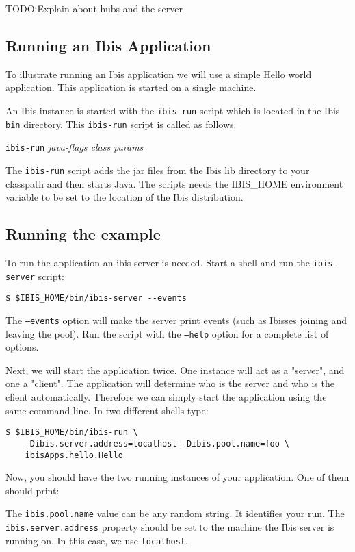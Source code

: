 \documentclass[10pt]{article}
\newcommand{\mysubsection}[1]{\subsection{#1}\label{#1}}
\begin{document}
TODO:Explain about hubs and the server

\mysubsection{Running an Ibis Application}

To illustrate running an Ibis application we will use a simple Hello
world application. This application is started on a single machine.

An Ibis instance is started with the \texttt{ibis-run} script which
is located in the Ibis \texttt{bin} directory.  This \texttt{ibis-run}
script is called as follows:
\begin{center}
\texttt{ibis-run} \emph{java-flags class params}
\end{center}

The \texttt{ibis-run} script adds the jar files
from the Ibis lib directory to your classpath and then starts Java. The
scripts needs the IBIS\_HOME environment variable to be set to the
location of the Ibis distribution.

\mysubsection{Running the example}
To run the application an ibis-server is needed. Start a shell and
run the \texttt{ibis-server} script:
\noindent
{\small
\begin{verbatim}
$ $IBIS_HOME/bin/ibis-server --events
\end{verbatim}
}
\noindent

The \texttt{--events} option will make the server print events (such as
Ibisses joining and leaving the pool). Run the script with the
\texttt{--help} option for a complete list of options.

Next, we will start the application twice. One instance will act as a  
"server", and one a "client". The application will determine who is
the server and who is the client automatically. Therefore we can simply start the application using
the same command line. In two different shells type:

\noindent
{\small
\begin{verbatim}
$ $IBIS_HOME/bin/ibis-run \
    -Dibis.server.address=localhost -Dibis.pool.name=foo \
    ibisApps.hello.Hello
\end{verbatim}
}
\noindent
Now, you should have the two running instances of your application. One of them should print:

 \noindent 

The \texttt{ibis.pool.name} value can be any random string.  It
identifies your run. The \texttt{ibis.server.address} property should be
set to the machine the Ibis server is running on. In this case, we use
\texttt{localhost}.
\end{document}
